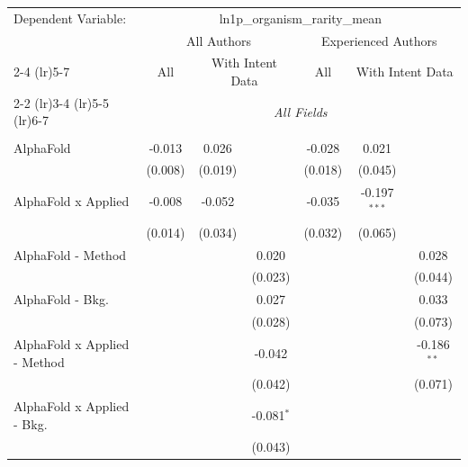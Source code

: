 \begingroup
\centering
\begin{tabular}{lcccccc}
   \tabularnewline \midrule \midrule
   Dependent Variable: & \multicolumn{6}{c}{ln1p\_organism\_rarity\_mean}\\
 & \multicolumn{3}{c}{All Authors} & \multicolumn{3}{c}{Experienced Authors} \\
\cmidrule(lr){2-4} \cmidrule(lr){5-7}
 & \multicolumn{1}{c}{All} & \multicolumn{2}{c}{With Intent Data} & \multicolumn{1}{c}{All} & \multicolumn{2}{c}{With Intent Data} \\
\cmidrule(lr){2-2} \cmidrule(lr){3-4} \cmidrule(lr){5-5} \cmidrule(lr){6-7}
 & \multicolumn{6}{c}{\textit{All Fields}} \\ \\
   AlphaFold                      & -0.013       & 0.026        &               & -0.028  & 0.021          &   \\   
                                  & (0.008)      & (0.019)      &               & (0.018) & (0.045)        &   \\   
   AlphaFold x Applied            & -0.008       & -0.052       &               & -0.035  & -0.197$^{***}$ &   \\   
                                  & (0.014)      & (0.034)      &               & (0.032) & (0.065)        &   \\   
   AlphaFold - Method             &              &              & 0.020         &         &                & 0.028\\   
                                  &              &              & (0.023)       &         &                & (0.044)\\   
   AlphaFold - Bkg.               &              &              & 0.027         &         &                & 0.033\\   
                                  &              &              & (0.028)       &         &                & (0.073)\\   
   AlphaFold x Applied - Method   &              &              & -0.042        &         &                & -0.186$^{**}$\\   
                                  &              &              & (0.042)       &         &                & (0.071)\\   
   AlphaFold x Applied - Bkg.     &              &              & -0.081$^{*}$  &         &                &   \\   
                                  &              &              & (0.043)       &         &                &   \\   

\end{tabular}
